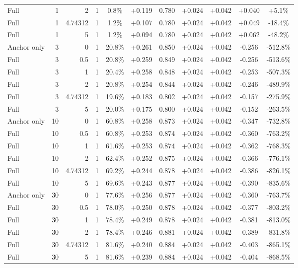 \begin{table}[htbp]
\begin{tabular}{lrrrccccccc}
Full & 1 & 2 & 1 & 0.8\% & +0.119 & 0.780 & +0.024 & +0.042 & +0.040 & +5.1\% \\
Full & 1 & 4.74312 & 1 & 1.2\% & +0.107 & 0.780 & +0.024 & +0.042 & +0.049 & -18.4\% \\
Full & 1 & 5 & 1 & 1.2\% & +0.094 & 0.780 & +0.024 & +0.042 & +0.062 & -48.2\% \\
Anchor only & 3 & 0 & 1 & 20.8\% & +0.261 & 0.850 & +0.024 & +0.042 & -0.256 & -512.8\% \\
Full & 3 & 0.5 & 1 & 20.8\% & +0.259 & 0.849 & +0.024 & +0.042 & -0.256 & -513.6\% \\
Full & 3 & 1 & 1 & 20.4\% & +0.258 & 0.848 & +0.024 & +0.042 & -0.253 & -507.3\% \\
Full & 3 & 2 & 1 & 20.8\% & +0.254 & 0.844 & +0.024 & +0.042 & -0.246 & -489.9\% \\
Full & 3 & 4.74312 & 1 & 19.6\% & +0.183 & 0.802 & +0.024 & +0.042 & -0.157 & -275.9\% \\
Full & 3 & 5 & 1 & 20.0\% & +0.175 & 0.800 & +0.024 & +0.042 & -0.152 & -263.5\% \\
Anchor only & 10 & 0 & 1 & 60.8\% & +0.258 & 0.873 & +0.024 & +0.042 & -0.347 & -732.8\% \\
Full & 10 & 0.5 & 1 & 60.8\% & +0.253 & 0.874 & +0.024 & +0.042 & -0.360 & -763.2\% \\
Full & 10 & 1 & 1 & 61.6\% & +0.253 & 0.874 & +0.024 & +0.042 & -0.362 & -768.3\% \\
Full & 10 & 2 & 1 & 62.4\% & +0.252 & 0.875 & +0.024 & +0.042 & -0.366 & -776.1\% \\
Full & 10 & 4.74312 & 1 & 69.2\% & +0.244 & 0.878 & +0.024 & +0.042 & -0.386 & -826.1\% \\
Full & 10 & 5 & 1 & 69.6\% & +0.243 & 0.877 & +0.024 & +0.042 & -0.390 & -835.6\% \\
Anchor only & 30 & 0 & 1 & 77.6\% & +0.256 & 0.877 & +0.024 & +0.042 & -0.360 & -763.7\% \\
Full & 30 & 0.5 & 1 & 78.0\% & +0.250 & 0.878 & +0.024 & +0.042 & -0.377 & -803.2\% \\
Full & 30 & 1 & 1 & 78.4\% & +0.249 & 0.878 & +0.024 & +0.042 & -0.381 & -813.0\% \\
Full & 30 & 2 & 1 & 78.4\% & +0.246 & 0.881 & +0.024 & +0.042 & -0.389 & -831.8\% \\
Full & 30 & 4.74312 & 1 & 81.6\% & +0.240 & 0.884 & +0.024 & +0.042 & -0.403 & -865.1\% \\
Full & 30 & 5 & 1 & 81.6\% & +0.239 & 0.884 & +0.024 & +0.042 & -0.404 & -868.5\% \\

\end{tabular}
\end{table}
